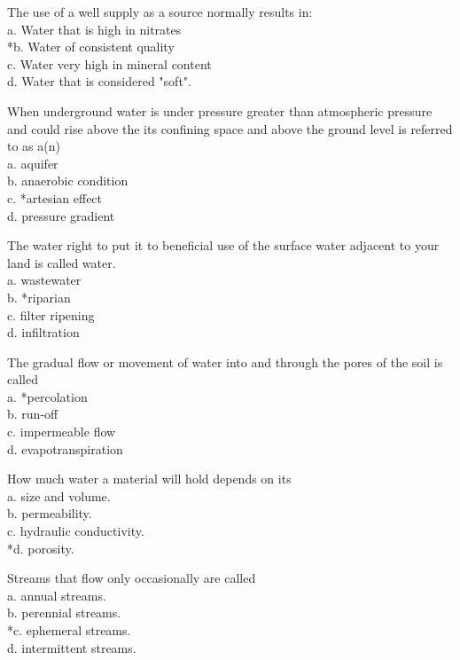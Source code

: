 \item The use of a well supply as a source normally results in:\\
a. Water that is high in nitrates\\
*b. Water of consistent quality\\
c. Water very high in mineral content\\
d. Water that is considered "soft".\\

\item When underground water is under pressure greater than atmospheric pressure and could rise above the its confining space and above the ground level is referred to as a(n)\\
a. aquifer\\
b. anaerobic condition\\
c. *artesian effect\\
d. pressure gradient\\

  \item The water right to put it to beneficial use of the surface water adjacent to your land is called water.\\
a. wastewater\\
b. *riparian\\
c. filter ripening\\
d. infiltration\\


  \item The gradual flow or movement of water into and through the pores of the soil is called\\
a. *percolation\\
b. run-off\\
c. impermeable flow\\
d. evapotranspiration\\

  \item How much water a material will hold depends on its\\
a. size and volume.\\
b. permeability.\\
c. hydraulic conductivity.\\
*d. porosity.\\

  \item Streams that flow only occasionally are called\\
a. annual streams.\\
b. perennial streams.\\
*c. ephemeral streams.\\
d. intermittent streams.\\

